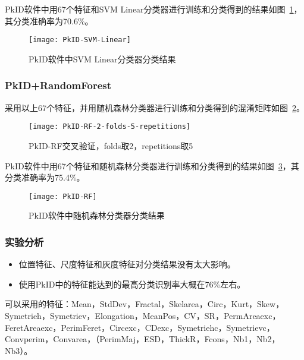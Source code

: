 PkID软件中用67个特征和SVM Linear分类器进行训练和分类得到的结果如图~\ref{fig:PkID-SVM-Linear}，其分类准确率为70.6\%。
\begin{figure}[!ht]
\centering
\texttt{[image: PkID-SVM-Linear]}
\caption{PkID软件中SVM Linear分类器分类结果}
\label{fig:PkID-SVM-Linear}
\end{figure}

\subsubsection{PkID+RandomForest}
采用以上67个特征，并用随机森林分类器进行训练和分类得到的混淆矩阵如图~\ref{fig: PkID-RF-2-folds-5-repetitions}。

\begin{figure}[!ht]
\centering
\texttt{[image: PkID-RF-2-folds-5-repetitions]}
\caption{PkID-RF交叉验证，folds取2，repetitions取5}
\label{fig: PkID-RF-2-folds-5-repetitions}
\end{figure}

PkID软件中用67个特征和随机森林分类器进行训练和分类得到的结果如图~\ref{fig:PkID-RF}，其分类准确率为75.4\%。

\begin{figure}[!ht]
\centering
\texttt{[image: PkID-RF]}
\caption{PkID软件中随机森林分类器分类结果}
\label{fig:PkID-RF}
\end{figure}

\subsubsection{实验分析}
\begin{itemize}
\item 位置特征、尺度特征和灰度特征对分类结果没有太大影响。
\item 使用PkID中的特征能达到的最高分类识别率大概在76\%左右。
\end{itemize}
可以采用的特征：Mean，StdDev，Fractal，Skelarea，Circ，Kurt，Skew，Symetrieh，Symetriev，Elongation，MeanPos，CV，SR，PermAreaexc，FeretAreaexc，PerimFeret，Circexc，CDexc，{\color{blue}Symetriehc，Symetrievc，Convperim，Convarea}，（PerimMaj，ESD，{\color{blue}ThickR，Fcons，Nb1，Nb2，Nb3}）。






